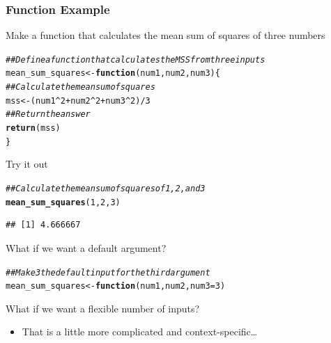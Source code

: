 \documentclass{beamer}\usepackage[]{graphicx}\usepackage[]{color}
\makeatletter
\newcommand{\hlnum}[1]{\textcolor[rgb]{0.686,0.059,0.569}{#1}}%
\newcommand{\hlcom}[1]{\textcolor[rgb]{0.678,0.584,0.686}{\textit{#1}}}%
\newcommand{\hlopt}[1]{\textcolor[rgb]{0,0,0}{#1}}%
\newcommand{\hlstd}[1]{\textcolor[rgb]{0.345,0.345,0.345}{#1}}%
\newcommand{\hlkwa}[1]{\textcolor[rgb]{0.161,0.373,0.58}{\textbf{#1}}}%
\newcommand{\hlkwb}[1]{\textcolor[rgb]{0.69,0.353,0.396}{#1}}%
\newcommand{\hlkwc}[1]{\textcolor[rgb]{0.333,0.667,0.333}{#1}}%
\newcommand{\hlkwd}[1]{\textcolor[rgb]{0.737,0.353,0.396}{\textbf{#1}}}%
\newenvironment{kframe}{%
 \def\at@end@of@kframe{}%
 \ifinner\ifhmode%
  \def\at@end@of@kframe{\end{minipage}}%
  \begin{minipage}{\columnwidth}%
 \fi\fi%
 \def\FrameCommand##1{\hskip\@totalleftmargin \hskip-\fboxsep
 \colorbox{shadecolor}{##1}\hskip-\fboxsep
     \hskip-\linewidth \hskip-\@totalleftmargin \hskip\columnwidth}%
 \MakeFramed {\advance\hsize-\width
   \@totalleftmargin\z@ \linewidth\hsize
   \@setminipage}}%
 {\par\unskip\endMakeFramed%
 \at@end@of@kframe}
\newenvironment{knitrout}{}{} %
\makeatother
\begin{document}
\begin{frame}[fragile]\frametitle{Function Example}
    Make a function that calculates the mean sum of squares of three numbers \\
\begin{knitrout}\footnotesize
{}\color{fgcolor}\begin{kframe}
\begin{alltt}
\hlcom{## Define a function that calculates the MSS from three inputs}
\hlstd{mean_sum_squares} \hlkwb{<-} \hlkwa{function}\hlstd{(}\hlkwc{num1}\hlstd{,} \hlkwc{num2}\hlstd{,} \hlkwc{num3}\hlstd{)\{}
  \hlcom{## Calculate the mean sum of squares}
  \hlstd{mss} \hlkwb{<-} \hlstd{(num1}\hlopt{^}\hlnum{2} \hlopt{+} \hlstd{num2}\hlopt{^}\hlnum{2} \hlopt{+} \hlstd{num3}\hlopt{^}\hlnum{2}\hlstd{)} \hlopt{/} \hlnum{3}
  \hlcom{## Return the answer}
  \hlkwd{return}\hlstd{(mss)}
\hlstd{\}}
\end{alltt}
\end{kframe}
\end{knitrout}
    \vspace{1ex}
    Try it out
\begin{knitrout}\footnotesize
{}\color{fgcolor}\begin{kframe}
\begin{alltt}
\hlcom{## Calculate the mean sum of squares of 1, 2, and 3}
\hlkwd{mean_sum_squares}\hlstd{(}\hlnum{1}\hlstd{,} \hlnum{2}\hlstd{,} \hlnum{3}\hlstd{)}
\end{alltt}
\begin{verbatim}
## [1] 4.666667
\end{verbatim}
\end{kframe}
\end{knitrout}
    \vspace{1ex}
    What if we want a default argument?
\begin{knitrout}\footnotesize
{}\color{fgcolor}\begin{kframe}
\begin{alltt}
\hlcom{## Make 3 the default input for the third argument}
mean_sum_squares <- \hlkwd{function}(num1, num2, num3 = 3)
\end{alltt}
\end{kframe}
\end{knitrout}
    \vspace{1ex}
    What if we want a flexible number of inputs?
    \begin{itemize}
        \item That is a little more complicated and context-specific\ldots
    \end{itemize}
\end{frame}
\end{document}
